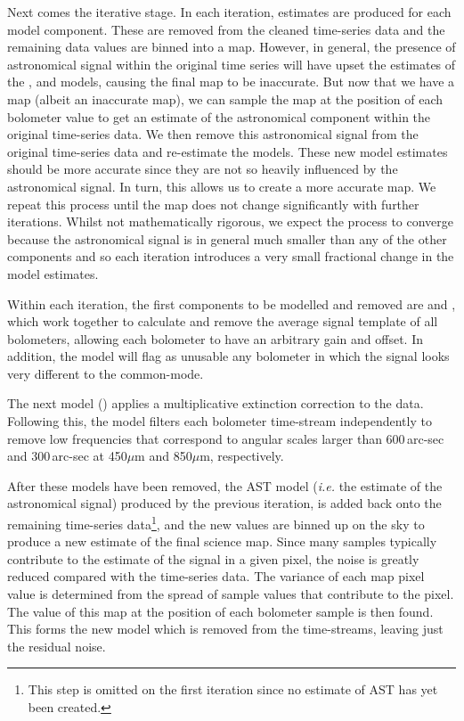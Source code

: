 \begin{enumdesc}
  Next comes the iterative stage. In each iteration, estimates are
  produced for each model component. These are removed from the cleaned
  time-series data and the remaining data values are binned into a map.
  However, in general, the presence of astronomical signal within the
  original time series will have upset the estimates of the ,
   and  models, causing the final map to be
  inaccurate. But now that we have a map (albeit an inaccurate map), we
  can sample the map at the position of each bolometer value to get an
  estimate of the astronomical component within the original time-series
  data. We then remove this astronomical signal from the original
  time-series data and re-estimate the models. These new model estimates
  should be more accurate since they are not so heavily
  influenced by the astronomical signal. In turn, this allows us to
  create a more accurate map.  We repeat this process until the map does
  not change significantly with further iterations. Whilst not
  mathematically rigorous, we expect the process to converge because the
  astronomical signal is in general much smaller than any of the other
  components and so each iteration introduces a very small fractional
  change in the model estimates.

  Within each iteration, the first components to be modelled and removed
  are  and , which work together to calculate and
  remove the average signal template of all bolometers, allowing each
  bolometer to have an arbitrary gain and offset. In addition, the
   model will flag as unusable any bolometer in which the
  signal looks very different to the common-mode.

  The next model
  () applies a multiplicative extinction correction to the
  data. Following this, the  model filters each bolometer
  time-stream independently to remove low frequencies that correspond
  to angular scales larger than 600\,arc-sec and 300\,arc-sec at
  450$\mu$m and 850$\mu$m, respectively.

  After these models have been removed, the AST model (\emph{i.e.} the
  estimate of the astronomical signal) produced by the previous iteration,
  is added back onto the remaining time-series data\footnote{This step is
  omitted on the first iteration since no estimate of AST has yet been
  created.}, and the new values are binned up on the sky to produce a new
  estimate of the final science map.  Since many samples typically
  contribute to the estimate of the signal in a given pixel, the noise is
  greatly reduced compared with the time-series data. The variance of
  each map pixel value is determined from the spread of sample values
  that contribute to the pixel.  The value of this map at the position
  of each bolometer sample is then found. This forms the new 
  model which is removed from the time-streams, leaving just the residual
  noise.


\end{enumdesc}
